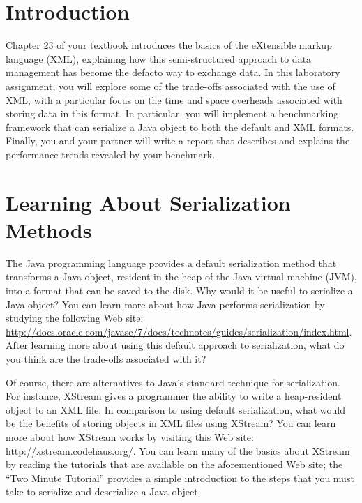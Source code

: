 


\usepackage[compact]{titlesec}



\section*{Introduction}

Chapter 23 of your textbook introduces the basics of the eXtensible markup language (XML), explaining how this
semi-structured approach to data management has become the defacto way to exchange data. In this laboratory assignment,
you will explore some of the trade-offs associated with the use of XML, with a particular focus on the time and space
overheads associated with storing data in this format. In particular, you will implement a benchmarking framework that
can serialize a Java object to both the default and XML formats.  Finally, you and your partner will write a 
report that describes and explains the performance trends revealed by your benchmark.

\vspace*{-.05in}
\section*{Learning About Serialization Methods}

The Java programming language provides a default serialization method that transforms a Java object, resident in the
heap of the Java virtual machine (JVM), into a format that can be saved to the disk. Why would it be useful to serialize
a Java object? You can learn more about how Java performs serialization by studying the following Web site:
\url{http://docs.oracle.com/javase/7/docs/technotes/guides/serialization/index.html}. After learning more about using
this default approach to serialization, what do you think are the trade-offs associated with it?

Of course, there are alternatives to Java's standard technique for serialization.  For instance, XStream gives a
programmer the ability to write a heap-resident object to an XML file. In comparison to using default serialization, what
would be the benefits of storing objects in XML files using XStream? You can learn more about how XStream works by
visiting this Web site: \url{http://xstream.codehaus.org/}. You can learn many of the basics about XStream by reading
the tutorials that are available on the aforementioned Web site; the ``Two Minute Tutorial'' provides a simple
introduction to the steps that you must take to serialize and deserialize a Java object. 

